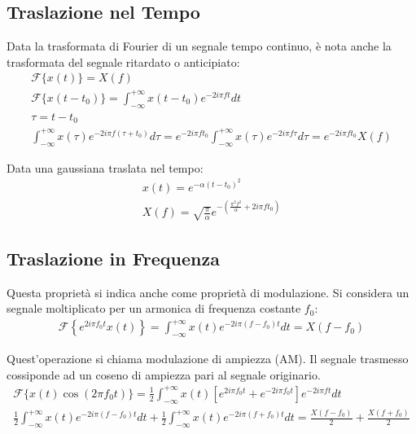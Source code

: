 \documentclass{article}
\numberwithin{equation}{subsection}
\begin{document}
\subsection{Traslazione nel Tempo}

Data la trasformata di Fourier di un segnale tempo continuo, è nota anche la trasformata del segnale ritardato o anticipiato:
\begin{gather*}
    \mathscr{F}\{x(t)\}=X(f)\\
    \mathscr{F}\{x(t-t_0)\}=\displaystyle\int_{-\infty}^{+\infty}x(t-t_0)e^{-2i\pi ft}dt\\
    \tau=t-t_0\\
    \displaystyle\int_{-\infty}^{+\infty}x(\tau)e^{-2i\pi f(\tau+t_0)}d\tau=e^{-2i\pi ft_0}\int_{-\infty}^{+\infty}x(\tau)e^{-2i\pi f\tau}d\tau=e^{-2i\pi ft_0}X(f)
\end{gather*}

Data una gaussiana traslata nel tempo:
\begin{gather*}
    x(t)=e^{-\alpha(t-t_0)^2}\\
    X(f)=\displaystyle\sqrt{\frac{\pi}{\alpha}}e^{-\left(\frac{\pi^2f^2}{\alpha}+2i\pi ft_0\right)}
\end{gather*}

\subsection{Traslazione in Frequenza}

Questa proprietà si indica anche come proprietà di modulazione. 
Si considera un segnale moltiplicato per un armonica di frequenza costante $f_0$:
\begin{gather*}
    \mathscr{F}\left\{e^{2i\pi f_0t}x(t)\right\}=\displaystyle\int_{-\infty}^{+\infty}x(t)e^{-2i\pi(f-f_0)t}dt=X(f-f_0)
\end{gather*}

Quest'operazione si chiama modulazione di ampiezza (AM). Il segnale trasmesso cossiponde ad un coseno di ampiezza pari al segnale originario.
\begin{gather*}
    \mathscr{F}\{x(t)\cos(2\pi f_0t)\}=\displaystyle\frac{1}{2}\int_{-\infty}^{+\infty}x(t)\left[e^{2i\pi f_0t}+e^{-2i\pi f_0t}\right]e^{-2i\pi ft}dt\\
    \frac{1}{2}\displaystyle\int_{-\infty}^{+\infty}x(t)e^{-2i\pi(f-f_0)t}dt+\frac{1}{2}\int_{-\infty}^{+\infty}x(t)e^{-2i\pi (f+f_0)t}dt=\frac{X(f-f_0)}{2}+\frac{X(f+f_0)}{2}
\end{gather*}
\end{document}
